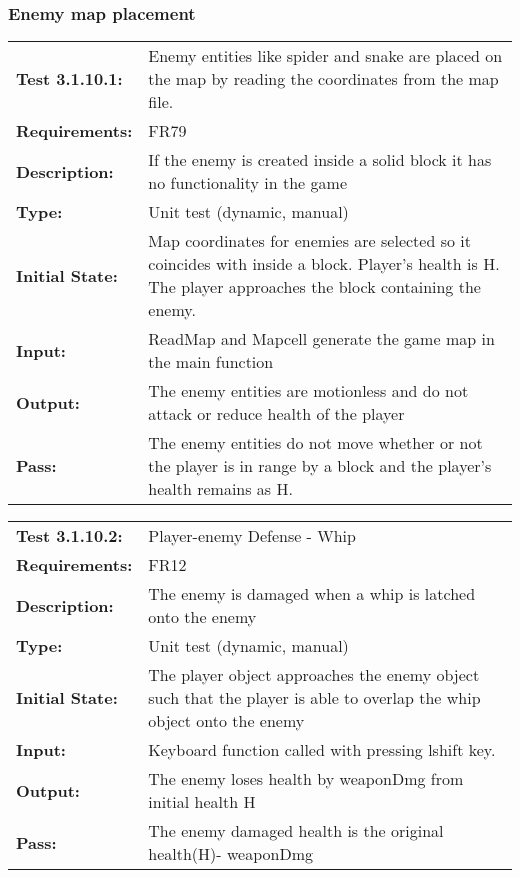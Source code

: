 \documentclass[12pt, titlepage]{article}
\begin{document}
\subsubsection{Enemy map placement}
\begin{tabular}{|l|p{10cm}|}
    \hline
    \bf{Test} 3.1.10.1: & Enemy entities like spider and snake are placed on the map by reading the coordinates from the map file.\ \\
    \bf{Requirements}: & FR79\\
    \bf{Description}: & If the enemy is created inside a solid block it has no functionality in the game \\
    \bf{Type}:  &  Unit test (dynamic, manual)   \\
    \bf{Initial State}: & Map coordinates for enemies are selected so it coincides with inside a block. Player's health is H. The player approaches the block containing the enemy.\\
    \bf{Input}: & ReadMap and Mapcell generate the game map in the main function \\
    \bf{Output}: & The enemy entities are motionless and do not attack or reduce health of the player\\
    \bf{Pass}: & The enemy entities do not move whether or not the player is in range by a block and the player's health remains as H.\\
    \hline
\end{tabular}

\begin{tabular}{|l|p{10cm}|}
    \hline
    \bf{Test} 3.1.10.2: & Player-enemy Defense - Whip \\
    \bf{Requirements}: & FR12\\
    \bf{Description}: & The enemy is damaged when a whip is latched onto the enemy\\
    \bf{Type}:  &  Unit test (dynamic, manual)   \\
    \bf{Initial State}: & The player object approaches the enemy object such that the player is able to overlap the whip object onto the enemy \\
    \bf{Input}: & Keyboard function called with pressing lshift key.\\
    \bf{Output}: & The enemy loses health by weaponDmg from initial health H \\
    \bf{Pass}: &  The enemy  damaged health is the original health(H)- weaponDmg\\
    \hline
\end{tabular}
\end{document}
